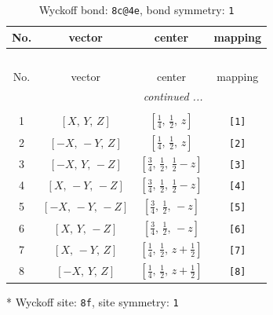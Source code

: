 \documentclass[fleqn,8pt]{jsarticle}
\begin{document}
\renewcommand{\arraystretch}{1.2}
\begin{longtable}{cccc}
\caption{Wyckoff bond: {\tt 8c@4e}, bond symmetry: {\tt 1}}
 \\
 \hline \hline
No. & vector & center & mapping \\ \hline \endfirsthead

\multicolumn{3}{l}{\tablename\ \thetable{}} \\
 \hline \hline
No. & vector & center & mapping \\ \hline \endhead

 \hline \hline
\multicolumn{3}{r}{\footnotesize\it continued ...} \\ \endfoot

 \hline \hline
\multicolumn{3}{r}{} \\ \endlastfoot

1 & $\left[ X,\, Y,\, Z \right]$ & $\left[ \frac{1}{4},\, \frac{1}{2},\, z \right]$ & {\tt [1]} \\ \hline
2 & $\left[ - X,\, - Y,\, Z \right]$ & $\left[ \frac{1}{4},\, \frac{1}{2},\, z \right]$ & {\tt [2]} \\ \hline
3 & $\left[ - X,\, Y,\, - Z \right]$ & $\left[ \frac{3}{4},\, \frac{1}{2},\, \frac{1}{2} - z \right]$ & {\tt [3]} \\ \hline
4 & $\left[ X,\, - Y,\, - Z \right]$ & $\left[ \frac{3}{4},\, \frac{1}{2},\, \frac{1}{2} - z \right]$ & {\tt [4]} \\ \hline
5 & $\left[ - X,\, - Y,\, - Z \right]$ & $\left[ \frac{3}{4},\, \frac{1}{2},\, - z \right]$ & {\tt [5]} \\ \hline
6 & $\left[ X,\, Y,\, - Z \right]$ & $\left[ \frac{3}{4},\, \frac{1}{2},\, - z \right]$ & {\tt [6]} \\ \hline
7 & $\left[ X,\, - Y,\, Z \right]$ & $\left[ \frac{1}{4},\, \frac{1}{2},\, z + \frac{1}{2} \right]$ & {\tt [7]} \\ \hline
8 & $\left[ - X,\, Y,\, Z \right]$ & $\left[ \frac{1}{4},\, \frac{1}{2},\, z + \frac{1}{2} \right]$ & {\tt [8]} \\
\end{longtable}
* Wyckoff site: {\tt 8f}, site symmetry: {\tt 1}
\renewcommand{\arraystretch}{1.2}
\end{document}
